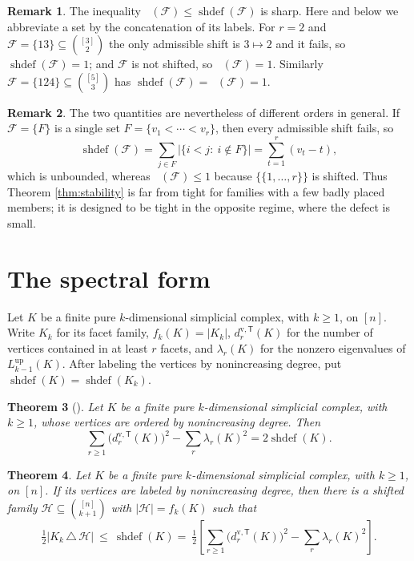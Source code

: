 \documentclass[11pt,reqno]{amsart}
\theoremstyle{plain}
\newtheorem{theorem}{Theorem}[section]
\theoremstyle{definition}
\newtheorem{remark}[theorem]{Remark}
\DeclareMathOperator{\shdef}{shdef}
\DeclareMathOperator{\dsh}{dist_{sh}}
\newcommand{\dvT}[1]{d^{\mathrm{v},\mathsf{T}}_{#1}}
\newcommand{\Lup}{L^{\mathrm{up}}_{k-1}}
\newcommand{\F}{\mathcal{F}}
\newcommand{\HH}{\mathcal{H}}
\begin{document}
\begin{remark}\label{rmk:sharp}
The inequality $\dsh(\F)\le\shdef(\F)$ is sharp. Here and below we abbreviate a set by the concatenation of its labels. For $r=2$ and
$\F=\{13\}\subseteq\binom{[3]}{2}$ the
only admissible shift is $3\mapsto2$ and it fails, so $\shdef(\F)=1$; and $\F$ is not shifted, so
$\dsh(\F)=1$. Similarly $\F=\{124\}\subseteq\binom{[5]}{3}$ has $\shdef(\F)=\dsh(\F)=1$.
\end{remark}

\begin{remark}\label{rmk:gap}
The two quantities are nevertheless of different orders in general. If $\F=\{F\}$ is a single set
$F=\{v_1<\cdots<v_r\}$, then every admissible shift fails, so
\[
\shdef(\F)=\sum_{j\in F}\bigl|\{i<j:\ i\notin F\}\bigr|=\sum_{t=1}^{r}(v_t-t),
\]
which is unbounded, whereas $\dsh(\F)\le1$ because $\{\{1,\dots,r\}\}$ is shifted. Thus Theorem
\ref{thm:stability} is far from tight for families with a few badly placed members; it is designed
to be tight in the opposite regime, where the defect is small.
\end{remark}

\section{The spectral form}\label{sec:spectral}

Let $K$ be a finite pure $k$-dimensional simplicial complex, with $k\ge1$, on $[n]$. Write $K_k$
for its facet family, $f_k(K)=|K_k|$, $\dvT{r}(K)$ for the number of vertices contained in at least $r$ facets,
and $\lambda_r(K)$ for the nonzero eigenvalues of $\Lup(K)$. After labeling the vertices by
nonincreasing degree, put $\shdef(K)=\shdef(K_k)$.

\begin{theorem}[{\cite[Theorem 3.9]{Gupta}}]\label{thm:import}
Let $K$ be a finite pure $k$-dimensional simplicial complex, with $k\ge1$, whose vertices are
ordered by nonincreasing degree. Then
\[
\sum_{r\ge1}\bigl(\dvT{r}(K)\bigr)^{2}-\sum_{r}\lambda_r(K)^{2}=2\shdef(K).
\]
\end{theorem}

\begin{theorem}\label{thm:spectral}
Let $K$ be a finite pure $k$-dimensional simplicial complex, with $k\ge1$, on $[n]$. If its vertices
are labeled by nonincreasing degree, then there is a shifted family
$\HH\subseteq\binom{[n]}{k+1}$ with $|\HH|=f_k(K)$ such that
\[
\tfrac12\bigl|K_k\,\triangle\,\HH\bigr|\ \le\ \shdef(K)
=\ \tfrac12\left[\sum_{r\ge1}\bigl(\dvT{r}(K)\bigr)^{2}-\sum_{r}\lambda_r(K)^{2}\right].
\]
\end{theorem}
\end{document}
